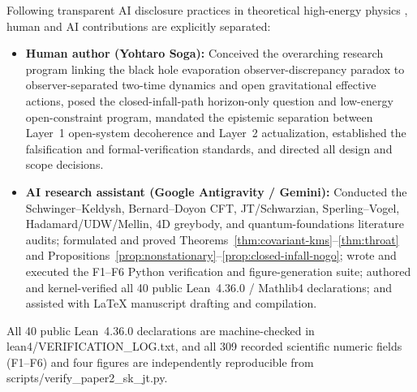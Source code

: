 \documentclass[11pt,a4paper]{article}
\theoremstyle{definition}
\theoremstyle{remark}
\newcommand{\1}{\mathbf{1}}
\newcommand{\code}[1]{{\scriptsize\ttfamily #1}}
\begin{document}
Following transparent AI disclosure practices in theoretical high-energy physics \cite{Michel2026}, human and AI contributions are explicitly separated:
\begin{itemize}
  \item \textbf{Human author (Yohtaro Soga):} Conceived the overarching research program linking the black hole evaporation observer-discrepancy paradox to observer-separated two-time dynamics and open gravitational effective actions, posed the closed-infall-path horizon-only question and low-energy open-constraint program, mandated the epistemic separation between Layer~1 open-system decoherence and Layer~2 actualization, established the falsification and formal-verification standards, and directed all design and scope decisions.
  \item \textbf{AI research assistant (Google Antigravity / Gemini):} Conducted the Schwinger--Keldysh, Bernard--Doyon CFT, JT/Schwarzian, Sperling--Vogel, Hadamard/UDW/Mellin, 4D greybody, and quantum-foundations literature audits; formulated and proved Theorems~\ref{thm:covariant-kms}--\ref{thm:throat} and Propositions~\ref{prop:nonstationary}--\ref{prop:closed-infall-nogo}; wrote and executed the F1--F6 Python verification and figure-generation suite; authored and kernel-verified all 40 public Lean~4.36.0 / Mathlib4 declarations; and assisted with LaTeX manuscript drafting and compilation.
\end{itemize}
All 40 public Lean~4.36.0 declarations are machine-checked in \code{lean4/\allowbreak VERIFICATION\_\allowbreak LOG.txt}, and all 309 recorded scientific numeric fields (F1--F6) and four figures are independently reproducible from \code{scripts/\allowbreak verify\_\allowbreak paper2\_\allowbreak sk\_\allowbreak jt.py}.



\end{document}

